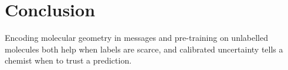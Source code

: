 \chapter{Conclusion}
\label{ch:conclusion}

Encoding molecular geometry in messages and pre-training on unlabelled molecules both help when
labels are scarce, and calibrated uncertainty tells a chemist when to trust a prediction.
